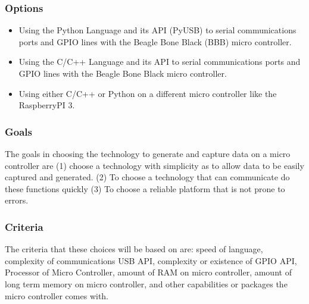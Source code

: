 \documentclass[10pt,draftclsnofoot,onecolumn]{IEEEtran}
\begin{document}
\subsubsection{Options}

	\begin{itemize}
	\item Using the Python Language and its API (PyUSB) to serial communications ports and GPIO lines with the Beagle Bone Black (BBB) micro controller.
	\item Using the C/C++ Language and its API to serial communications ports and GPIO lines with the Beagle Bone Black micro controller.
	\item Using either C/C++ or Python on a different micro controller like the RaspberryPI 3.\\
	\end{itemize}

\subsubsection{Goals}
The goals in choosing the technology to generate and capture data on a micro controller are (1) choose a technology with simplicity as to allow data to be easily captured and generated. (2) To choose a technology that can communicate do these functions quickly (3) To choose a reliable platform that is not prone to errors. \\
\subsubsection{Criteria}
The criteria that these choices will be based on are: speed of language, complexity of communications USB API, complexity or existence of GPIO API, Processor of Micro Controller, amount of RAM on micro controller, amount of long term memory on micro controller, and other capabilities or packages the micro controller comes with.\\
\end{document}
